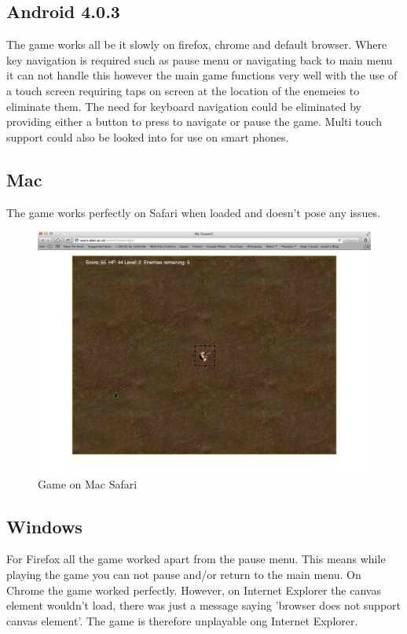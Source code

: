 \documentclass{article}
\begin{document}
\subsection{Android 4.0.3}
The game works all be it slowly on firefox, chrome and default browser. Where key navigation is required such as pause menu or navigating back to main menu it can not handle this however the main game functions very well with the use of a touch screen requiring taps on screen at the location of the enemeies to eliminate them. The need for keyboard navigation could be eliminated by providing either a button to press to navigate or pause the game. Multi touch support could also be looked into for use on smart phones.

\subsection{Mac}
The game works perfectly on Safari when loaded and doesn't pose any issues.

\begin{figure}[p]
\centering
\includegraphics[scale=0.3]{mac.jpg}
\caption{Game on Mac Safari}
\label{fig:Game_On_Safari}
\end{figure}

\subsection{Windows}
For Firefox all the game worked apart from the pause menu. This means while playing the game you can not pause and/or return to the main menu. On Chrome the game worked perfectly. However, on Internet Explorer the canvas element wouldn't load, there was just a message saying 'browser does not support canvas element'. The game is therefore unplayable ong Internet Explorer. 
\end{document}
